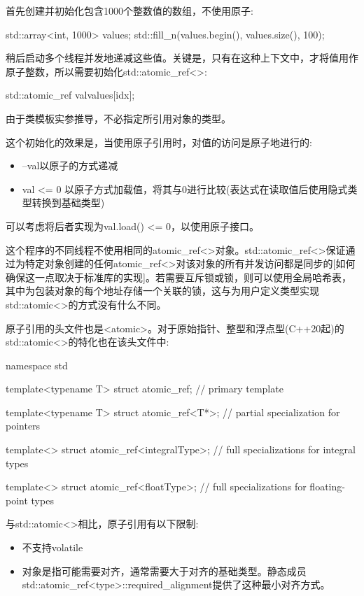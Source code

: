 首先创建并初始化包含1000个整数值的数组，不使用原子:

\begin{cpp}
std::array<int, 1000> values;
std::fill_n(values.begin(), values.size(), 100);
\end{cpp}

稍后启动多个线程并发地递减这些值。关键是，只有在这种上下文中，才将值用作原子整数，所以需要初始化std::atomic\_ref<>:

\begin{cpp}
std::atomic_ref val{values[idx]};
\end{cpp}

由于类模板实参推导，不必指定所引用对象的类型。

这个初始化的效果是，当使用原子引用时，对值的访问是原子地进行的:

\begin{itemize}
\item
--val以原子的方式递减

\item
val <= 0 以原子方式加载值，将其与0进行比较(表达式在读取值后使用隐式类型转换到基础类型)
\end{itemize}

可以考虑将后者实现为val.load() <= 0，以使用原子接口。

这个程序的不同线程不使用相同的atomic\_ref<>对象。std::atomic\_ref<>保证通过为特定对象创建的任何atomic\_ref<>对该对象的所有并发访问都是同步的[如何确保这一点取决于标准库的实现]。若需要互斥锁或锁，则可以使用全局哈希表，其中为包装对象的每个地址存储一个关联的锁，这与为用户定义类型实现std::atomic<>的方式没有什么不同。


原子引用的头文件也是<atomic>。对于原始指针、整型和浮点型(C++20起)的std::atomic<>的特化也在该头文件中:

\begin{cpp}
namespace std {
	template<typename T> struct atomic_ref; // primary template

	template<typename T> struct atomic_ref<T*>; // partial specialization for pointers

	template<> struct atomic_ref<integralType>; // full specializations for integral types

	template<> struct atomic_ref<floatType>; // full specializations for floating-point types
}
\end{cpp}

与std::atomic<>相比，原子引用有以下限制:

\begin{itemize}
\item
不支持volatile

\item
对象是指可能需要对齐，通常需要大于对齐的基础类型。静态成员std::atomic\_ref<type>::required\_alignment提供了这种最小对齐方式。
\end{itemize}

